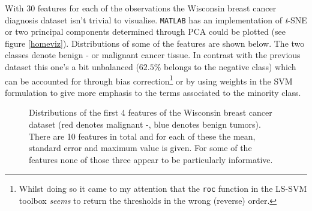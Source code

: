 
With 30 features for each of the observations the Wisconsin breast cancer diagnosis dataset isn't trivial to visualise. \texttt{MATLAB} has an implementation of \textit{t}-SNE or two principal components determined through PCA could be plotted (see figure \ref{homeviz}). Distributions of some of the features are shown below. The two classes denote benign - or malignant cancer tissue. In contrast with the previous dataset this one's a bit unbalanced ($62.5\%$ belongs to the negative class) which can be accounted for through bias correction\footnote{Whilst doing so it came to my attention that the \texttt{roc} function in the LS-SVM toolbox \textit{seems} to return the thresholds in the wrong (reverse) order.} or by using weights in the SVM formulation to give more emphasis to the terms associated to the minority class. 

\vspace{-0.5cm}
\begin{figure}[htp]
\centering
{}\hfil
{}\hfil
{}\hfil
{}\hfil
\caption{Distributions of the first 4 features of the Wisconsin breast cancer dataset (red denotes malignant -, blue denotes benign tumors). There are 10 features in total and for each of these the mean, standard error and maximum value is given. For some of the features none of those three appear to be particularly informative.}
\label{breasthist}
\end{figure}

